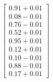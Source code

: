 \documentclass[preview]{standalone}
\begin{document}
\begin{align*}
\begin{bmatrix} 0.91 + 0.01 \\ 0.08 - 0.01 \\ 0.76 - 0.01 \\ 0.52 + 0.01 \\ 0.95 + 0.01 \\ 0.12 + 0.01 \\ 0.10 - 0.01 \\ 0.88 - 0.01 \\ 0.17 + 0.01 \end{bmatrix}
\end{align*}
\end{document}
